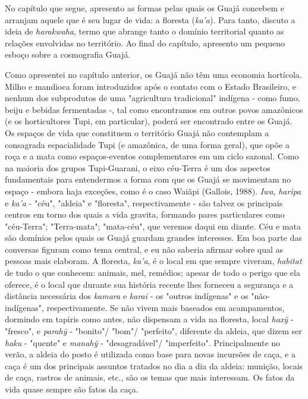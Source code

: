 No capítulo que segue, apresento as formas pelas quais os Guajá concebem
e arranjam aquele que é seu lugar de vida: a floresta (\emph{ka'a}).
Para tanto, discuto a ideia de \emph{harakwaha}, termo que abrange tanto
o domínio territorial quanto as relações envolvidas no território. Ao
final do capítulo, apresento um pequeno esboço sobre a cosmografia
Guajá.

Como apresentei no capítulo anterior, os Guajá não têm uma economia
hortícola. Milho e mandioca foram introduzidos após o contato com o
Estado Brasileiro, e nenhum dos subprodutos de uma "agricultura
tradicional" indígena - como fumo, beiju e bebidas fermentadas -, tal
como encontramos em outros povos amazônicos (e os horticultores Tupi, em
particular), poderá ser encontrado entre os Guajá. Os espaços de vida
que constituem o território Guajá não contemplam a consagrada
espacialidade Tupi (e amazônica, de uma forma geral), que opõe a roça e
a mata como espaços-eventos complementares em um ciclo sazonal. Como na
maioria dos grupos Tupi-Guarani, o eixo céu-Terra é um dos aspectos
fundamentais para entendermos a forma com que os Guajá se movimentam no
espaço - embora haja exceções, como é o caso Waiãpi (Gallois, 1988).
\emph{Iwa}, \emph{haripa} e \emph{ka'a} - "céu", "aldeia" e "floresta",
respectivamente - são talvez os principais centros em torno dos quais a
vida gravita, formando pares particulares como "céu-Terra";
"Terra-mata"; "mata-céu", que veremos daqui em diante. Céu e mata são
domínios pelos quais os Guajá guardam grandes interesses. Em boa parte
das conversas figuram como tema central, e eu não saberia afirmar sobre
qual as pessoas mais elaboram. A floresta, \emph{ka'a}, é o local em que
sempre viveram, \emph{habitat} de tudo o que conhecem: animais, mel,
remédios; apesar de todo o perigo que ela oferece, é o local que durante
sua história recente lhes forneceu a segurança e a distância necessária
dos \emph{kamara} e \emph{karai} - os "outros indígenas" e os
"não-indígenas", respectivamente. Se não vivem mais baseados em
acampamentos, dormindo em tapiris como antes, não dispensam a vida na
floresta, local \emph{haxỹ} - "fresco", e \emph{parahỹ} - "bonito"/
"bom"/ "perfeito", diferente da aldeia, que dizem ser \emph{haku} -
"quente" e \emph{manahỹ} - "desagradável"/ "imperfeito". Principalmente
no verão, a aldeia do posto é utilizada como base para novas incursões
de caça, e a caça é um dos principais assuntos tratados no dia a dia da
aldeia: munição, locais de caça, rastros de animais, etc., são os temas
que mais interessam. Os fatos da vida quase sempre são fatos da caça.

